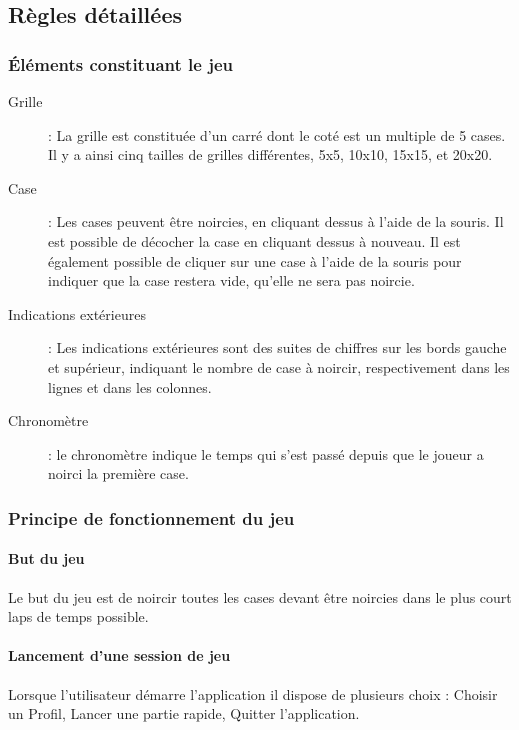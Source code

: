 \documentclass[11pt]{article}
\begin{document}
\subsection{Règles détaillées}

\subsubsection{Éléments constituant le jeu}

    \begin{description}
        \item[Grille] : La grille est constituée d'un carré dont le coté est un multiple de 5 cases. Il y a ainsi cinq
            tailles de grilles différentes, 5x5, 10x10, 15x15, et 20x20.
        \item[Case] : Les cases peuvent être noircies, en cliquant dessus à l'aide de la souris. Il est possible de décocher la case en cliquant dessus à nouveau. Il est également possible de cliquer sur une case à l'aide de la souris pour indiquer que la case restera vide, qu'elle ne sera pas noircie.
        \item[Indications extérieures] : Les indications extérieures sont des suites de chiffres sur les bords gauche et supérieur, indiquant le nombre de case à noircir, respectivement dans les lignes et dans les colonnes.
        \item[Chronomètre] : le chronomètre indique le temps qui s'est passé depuis que le joueur a noirci la première case.
    \end{description}

\subsubsection{Principe de fonctionnement du jeu}

\paragraph{But du jeu}
Le but du jeu est de noircir toutes les cases devant être noircies dans le plus court laps de temps possible.

\paragraph{Lancement d'une session de jeu}
Lorsque l'utilisateur démarre l'application il dispose de plusieurs choix : Choisir un Profil, Lancer une partie rapide,
Quitter l'application.
\end{document}
